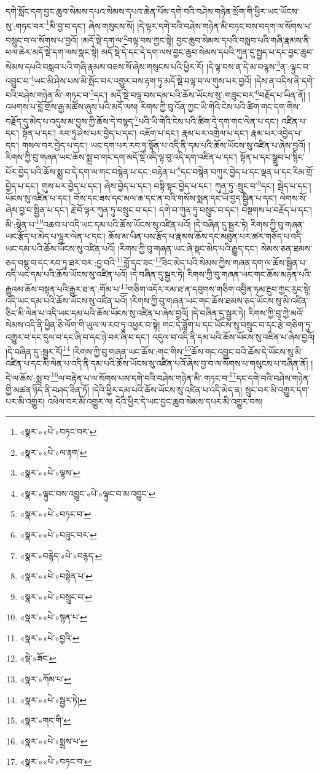 དགེ་སློང་དག་བྱང་ཆུབ་སེམས་དཔའ་སེམས་དཔའ་ཆེན་པོས་དགེ་བའི་བཤེས་གཉེན་སྲོག་གི་ཕྱིར་ཡང་ཡོངས་སུ་:གཏང་བར་\footnote{«སྣར་»«པེ་»བཏང་བར་}མི་བྱ་བ་དང་། ཞེས་གསུངས་སོ། །དེ་ལྟར་དགེ་བའི་བཤེས་གཉེན་མི་བཏང་བས་བདག་ལ་སོགས་པ་བསྲུང་བ་ལ་སོགས་པ་བྱའོ། །མདོ་སྡེ་དག་ལ་\footnote{«སྣར་»«པེ་»ལ་རྟག་}བལྟ་བས་ཀྱང་སྟེ། བྱང་ཆུབ་སེམས་དཔའི་བསླབ་པའི་གཞི་རྣམས་ནི་ཕལ་ཆེར་མདོ་སྡེ་དག་ལས་སྣང་སྟེ། མདོ་སྡེ་དེ་དང་དེ་དག་ལས་བྱང་ཆུབ་སེམས་དཔའི་ཀུན་དུ་སྤྱད་པ་དང་བྱང་ཆུབ་སེམས་དཔའི་བསླབ་པའི་གཞི་རྣམས་བཅས་སོ་ཞེས་གསུངས་པའི་ཕྱིར་རོ། །དེ་ལྟ་བས་ན་དེ་མ་བལྟས་\footnote{«སྣར་»«པེ་»ལྟས་}ན་:ལྟུང་བ་འབྱུང་བ་\footnote{«སྣར་»ལྟུང་བས་འབྱུང་«པེ་»ལྟུང་བ་མ་འབྱུང་}ཡང་མི་ཤེས་པས་མི་སྤོང་བར་འགྱུར་བས་རྟག་ཏུ་མདོ་སྡེ་བལྟ་བ་ལ་གུས་པར་བྱའོ། །དེས་ན་འདིས་ནི་དགེ་བའི་བཤེས་གཉེན་མི་:གཏང་བ་\footnote{«སྣར་»«པེ་»བཏང་བ་}དང་། མདོ་སྡེ་བལྟ་བས་དམ་པའི་ཆོས་ཡོངས་སུ་:གཟུང་བར་\footnote{«སྣར་»«པེ་»བཟུང་བར་}བརྗོད་པ་ཡིན་ནོ། །འཕགས་པ་བློ་གྲོས་རྒྱ་མཚོས་ཞུས་པའི་མདོ་ལས། རིགས་ཀྱི་བུ་འོན་ཀྱང་ཡི་གེའི་ངེས་པའི་ཚིག་གང་དག་གིས་བརྗོད་དུ་མེད་པ་འདུས་མ་བྱས་ཀྱི་ཆོས་དེ་བསྙད་\footnote{«སྣར་»བརྙེད་«པེ་»བརྙད་}པའི་ཡི་གེའི་ངེས་པའི་ཚིག་དེ་དག་གང་ལེན་པ་དང་། འཛིན་པ་དང་། སྟོན་པ་དང་། རབ་ཏུ་ཤེས་པར་བྱེད་པ་དང་། འཇོག་པ་དང་། རྣམ་པར་འགྲེལ་པ་དང་། རྣམ་པར་འབྱེད་པ་དང་། གསལ་བར་བྱེད་པ་དང་། ཡང་དག་པར་རབ་ཏུ་སྟོན་པ་འདི་ནི་དམ་པའི་ཆོས་ཡོངས་སུ་འཛིན་པ་ཞེས་བྱའོ། །རིགས་ཀྱི་བུ་གཞན་ཡང་ཆོས་སྨྲ་བ་གང་དག་མདོ་སྡེ་འདི་ལྟ་བུ་འདི་དག་འཛིན་པ་དང་། སྟོན་པ་དང་སྒྲུབ་པ་སྙིང་པོར་བྱེད་པའི་ཆོས་སྨྲ་བ་དེ་དག་ལ་གང་བསྙེན་པ་དང་:བརྟེན་པ་\footnote{«སྣར་»«པེ་»བསྟེན་པ་}དང་བསྙེན་བཀུར་བྱེད་པ་དང་ལྡན་པ་དང་རིམ་གྲོ་བྱེད་པ་དང་། གུས་པར་བྱེད་པ་དང་། ཞེས་བྱེད་པ་དང་། བསྟི་སྟང་བྱེད་པ་དང་། ཀུན་ཏུ་:སྲུང་བ་\footnote{«སྣར་»«པེ་»བསྲུང་བ་}དང་། སྦེད་པ་དང་། ཡོངས་སུ་འཛིན་པ་དང་། གོས་དང་ཟས་དང་མལ་ཆ་དང་ན་བའི་གསོས་སྨན་དང་ཡོ་བྱད་སྦྱིན་པ་དང་། ལེགས་སོ་ཞེས་བྱ་བ་སྦྱིན་པ་དང་། རྗེ་བོ་ལྟར་ཀུན་ཏུ་བསྲུང་བ་དང་། དགེ་བ་ཀུན་ཏུ་བསྲུང་བ་དང་། བསྔགས་པ་བརྗོད་པ་དང་། མི་:སྙེན་པ་\footnote{«སྣར་»«པེ་»སྙན་པ་}འཆབ་པ་འདི་ཡང་དམ་པའི་ཆོས་ཡོངས་སུ་འཛིན་པའོ། །དེ་བཞིན་དུ་སྦྱར་ཏེ། རིགས་ཀྱི་བུ་གཞན་ཡང་རྩོད་པ་མེད་པ་ལྷུར་ལེན་པ་དང་། ཆོས་མ་ཡིན་པས་རྩོད་པ་རྣམས་ཆོས་དང་མཐུན་པར་ཚར་གཅོད་པ་འདི་ཡང་དམ་པའི་ཆོས་ཡོངས་སུ་འཛིན་པའོ། །རིགས་ཀྱི་བུ་གཞན་ཡང་ཞེ་སྡང་མེད་པའི་རྒྱུད་དང་། སེམས་ཅན་ཐམས་ཅད་བསྡུ་བ་དང་རབ་ཏུ་ཐར་བར་:བྱ་བའི་\footnote{«སྣར་»«པེ་»བྱའི་}བློ་དང་ཟང་\footnote{«སྡེ་»ཟོང་}ཟིང་མེད་པའི་སེམས་ཀྱིས་གཞན་དག་ལ་ཆོས་སྦྱིན་པ་འདི་ཡང་དམ་པའི་ཆོས་ཡོངས་སུ་འཛིན་པའོ། །དེ་བཞིན་དུ་སྦྱར་ཏེ། རིགས་ཀྱི་བུ་གཞན་ཡང་གང་ཆོས་མཉན་པའི་རྒྱུའམ་ཆོས་བསྟན་པའི་རྒྱུར་ཐ་ན་:གོམ་པ་\footnote{«སྣར་»ཀོམ་པ་}གཅིག་འདོར་རམ་ཐ་ན་དབུགས་གཅིག་འབྱིན་ཏམ་རྔུབ་ཀྱང་རུང་སྟེ། འདི་ཡང་དམ་པའི་ཆོས་ཡོངས་སུ་འཛིན་པའོ། །རིགས་ཀྱི་བུ་གཞན་ཡང་གང་ཆོས་ཐམས་ཅད་ཡོངས་སུ་མི་འཛིན་ཅིང་མི་ལེན་པ་འདི་ཡང་དམ་པའི་ཆོས་ཡོངས་སུ་འཛིན་པ་ཞེས་བྱའོ། །དེ་བཞིན་དུ་སྦྱར་ཏེ། རིགས་ཀྱི་བུ་ཀྱེ་མའོ་སེམས་འདི་ནི་ཕྱིན་ཅི་ལོག་གི་ཡུལ་ལ་རབ་ཏུ་འཕྱར་བ་སྟེ། གང་དེ་ཟློག་པ་དང་ཡོངས་སུ་བསྲུང་བ་དང་རྩེ་གཅིག་ཏུ་འགྱུར་བ་དང་དུལ་བ་དང་ཞི་བ་དང་ཉེ་བར་ཞི་བ་དང་། འདུལ་བ་འདི་ནི་དམ་པའི་ཆོས་ཡོངས་སུ་འཛིན་པ་ཞེས་བྱའོ། །དེ་བཞིན་དུ་:སྦྱར་རོ།\footnote{«སྣར་»«པེ་»སྦྱར་ཏེ།} །རིགས་ཀྱི་བུ་གཞན་ཡང་ཆོས་:གང་གིས་\footnote{«སྣར་»གང་གི་}ཆོས་གང་འབྱུང་བའི་ཆོས་དེ་ཡོངས་སུ་མི་འཛིན་པ་དང་མི་ལེན་པ་འདི་ནི་དམ་པའི་ཆོས་ཡོངས་སུ་འཛིན་པའོ་ཞེས་བྱ་བ་ལ་སོགས་པ་གསུངས་པ་བཞིན་ནོ། །དེ་ལ་ཆོས་:སྨྲ་བ་\footnote{«སྣར་»«པེ་»སྨྲས་པ་}ལ་བརྟེན་པ་ལ་སོགས་པས་དགེ་བའི་བཤེས་གཉེན་མི་:གཏང་བ་\footnote{«སྣར་»«པེ་»བཏང་བ་}དང་དགེ་བའི་བཤེས་གཉེན་གྱི་མཚན་ཉིད་ནི་བཤད་ཟིན་ཏོ། །དེའི་ཕྱིར་དམ་པའི་ཆོས་ཡོངས་སུ་འཛིན་པ་འདི་མེད་ན། སྲུང་བར་མི་འགྱུར་དག་པར་མི་འགྱུར། འཕེལ་བར་མི་འགྱུར་ལ། དེའི་ཕྱིར་དེ་ཡང་བྱང་ཆུབ་སེམས་དཔར་མི་འགྱུར་བས། 